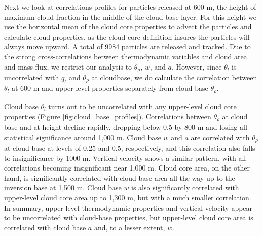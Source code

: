 \documentclass[acp]{copernicus}
\begin{document}
Next we look at correlations profiles for particles released at 600 m, the 
height of maximum cloud fraction in the middle of the cloud base layer.
For this height we use the horizontal mean of the cloud core properties to 
advect the particles and calculate cloud properties, as the cloud core 
definition insures the particles will always move upward.  A total of 
9984 particles are released and tracked.  Due to the strong cross-correlations 
between thermodynamic variables and cloud area and mass flux, we restrict our 
analysis to $\theta_\rho$, $w$, and $a$.  However, since $\theta_l$ is 
uncorrelated with $q_t$ and $\theta_\rho$ at cloudbase, we do calculate the 
correlation between $\theta_l$ at 600 m and upper-level properties separately 
from cloud base $\theta_\rho$.

Cloud base $\theta_l$ turns out to be uncorrelated with any upper-level 
cloud core properties (Figure \ref{fig:cloud_base_profiles}).  Correlations 
between $\theta_\rho$ at cloud base and at height decline rapidly, dropping 
below 0.5 by 800 m and losing all statistical significance around 1,000 m.  
Cloud base $w$ and $a$ are correlated with $\theta_\rho$ at cloud base at 
levels of 0.25 and 0.5, respectively, and this correlation also falls to 
insignificance by 1000 m.  Vertical velocity shows a similar pattern, with all 
correlations becoming insignificant near 1,000 m.  Cloud core area, on the 
other hand, is significantly correlated with cloud base area all the way up to 
the inversion base at 1,500 m.  Cloud base $w$ is also significantly correlated 
with upper-level cloud core area up to 1,300 m, but with a much smaller 
correlation.  In summary, upper-level thermodynamic properties and vertical 
velocity appear to be uncorrelated with cloud-base properties, but upper-level 
cloud core area is correlated with cloud base $a$ and, to a lesser extent, $w$.
\end{document}

